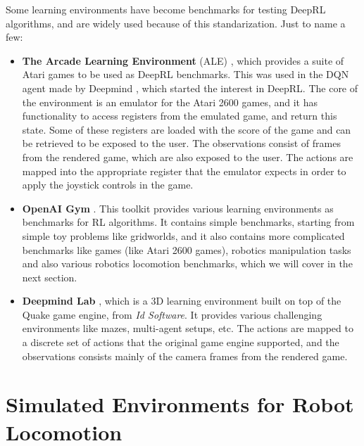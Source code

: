 Some learning environments have become benchmarks for testing DeepRL algorithms, and
are widely used because of this standarization. Just to name a few:

\begin{itemize}

    \item \textbf{The Arcade Learning Environment} (ALE) \citep{BellemareALE}, which provides a suite
           of Atari games to be used as DeepRL benchmarks. This was used in the DQN
           agent made by Deepmind \citep{DQNAtari}, which started the interest in DeepRL.
           The core of the environment is an emulator for the Atari 2600 games, and
           it has functionality to access registers from the emulated game, and return
           this state. Some of these registers are loaded with the score of the game
           and can be retrieved to be exposed to the user. The observations consist
           of frames from the rendered game, which are also exposed to the user. The actions
           are mapped into the appropriate register that the emulator expects in order
           to apply the joystick controls in the game.

           \figALEgames

    \item \textbf{OpenAI Gym} \citep{Gym}. This toolkit provides various learning environments
           as benchmarks for RL algorithms. It contains simple benchmarks, starting from simple
           toy problems like gridworlds, and it also contains more complicated benchmarks like
           games (like Atari 2600 games), robotics manipulation tasks and also various
           robotics locomotion benchmarks, which we will cover in the next section.

           \figOpenAIEnvs

    \item \textbf{Deepmind Lab} \citep{DeepmindLab}, which is a 3D learning environment built on top
           of the Quake game engine, from \textit{Id Software}. It provides various challenging
           environments like mazes, multi-agent setups, etc. The actions are mapped to a discrete
           set of actions that the original game engine supported, and the observations consists
           mainly of the camera frames from the rendered game.

           \figDeepmindLabEnvs

\end{itemize}

\section{Simulated Environments for Robot Locomotion}

